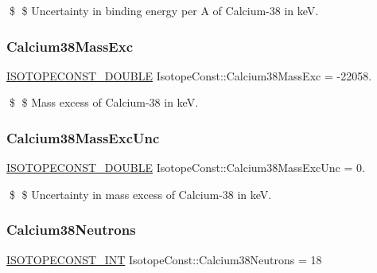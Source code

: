 \$ \$ Uncertainty in binding energy per A of Calcium-\/38 in keV. \mbox{\label{group___isotope_const-_calcium-_ca38_ga220568a094739319b23d97f759be3ecb}} 
\subsubsection{\texorpdfstring{Calcium38\+Mass\+Exc}{Calcium38MassExc}}
{\footnotesize\ttfamily \mbox{\hyperlink{group___isotope_const-_macros_ga8f45a7272ce02c0b4c65c44636ed719a}{I\+S\+O\+T\+O\+P\+E\+C\+O\+N\+S\+T\+\_\+\+D\+O\+U\+B\+LE}} Isotope\+Const\+::\+Calcium38\+Mass\+Exc = -\/22058.}

\$ \$ Mass excess of Calcium-\/38 in keV. \mbox{\label{group___isotope_const-_calcium-_ca38_gae70e570e4c2e6174da2d599e21195563}} 
\subsubsection{\texorpdfstring{Calcium38\+Mass\+Exc\+Unc}{Calcium38MassExcUnc}}
{\footnotesize\ttfamily \mbox{\hyperlink{group___isotope_const-_macros_ga8f45a7272ce02c0b4c65c44636ed719a}{I\+S\+O\+T\+O\+P\+E\+C\+O\+N\+S\+T\+\_\+\+D\+O\+U\+B\+LE}} Isotope\+Const\+::\+Calcium38\+Mass\+Exc\+Unc = 0.}

\$ \$ Uncertainty in mass excess of Calcium-\/38 in keV. \mbox{\label{group___isotope_const-_calcium-_ca38_ga64e12259008c5f41a95a16ccf7b73810}} 
\subsubsection{\texorpdfstring{Calcium38\+Neutrons}{Calcium38Neutrons}}
{\footnotesize\ttfamily \mbox{\hyperlink{group___isotope_const-_macros_ga5f18360b3e99483a35c32d789e62621c}{I\+S\+O\+T\+O\+P\+E\+C\+O\+N\+S\+T\+\_\+\+I\+NT}} Isotope\+Const\+::\+Calcium38\+Neutrons = 18}

